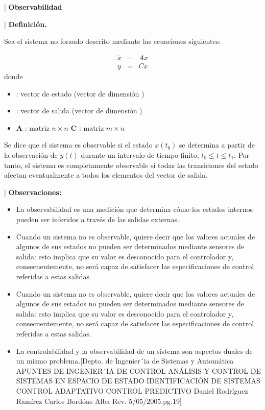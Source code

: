 \documentclass[10pt,a4paper]{article}
\begin{document}
\begin{center}|
{\Large \textbf{ Observabilidad}}\\
\end{center}

\begin{center}|
{\Large \textbf{ Definici\' on.}}\\
\end{center}
Sea el sistema no forzado descrito mediante las ecuaciones siguientes:

\begin{eqnarray}\label{sistem2}
\dot{x} & = & Ax \nonumber\\
y  & = & Cx 
\end{eqnarray}
donde
\begin{itemize}
\item {} : vector de estado (vector de dimensión )
\item {} : vector de salida (vector de dimensión )
\item \textbf{A} : matriz $n\times n$
\textbf{C} : matriz $m\times n$
\end{itemize}
Se dice que el sistema es observable si el estado $x(t_{0})$ se determina a partir de la observación de $y(t)$ durante un intervalo de tiempo finito, $t_{0}\leq t \leq t_{1}$. Por tanto, el sistema es completamente observable si todas las transiciones del estado afectan eventualmente a todos los elementos del vector de salida.\\
\begin{center}|
{\Large \textbf{ Observaciones:}}\\
\end{center}
\begin{itemize}
\item La observabilidad es una medición que determina c\' omo los estados internos pueden ser inferidos a trav\' es de las salidas externas.
\item Cuando un sistema no es observable, quiere decir que los valores actuales de algunos de sus estados no pueden ser determinados mediante sensores de salida: esto implica que su valor es desconocido para el controlador y, consecuentemente, no será capaz de satisfacer las especificaciones de control referidas a estas salidas.
\item Cuando un sistema no es observable, quiere decir que los valores actuales de algunos de sus estados no pueden ser determinados mediante sensores de salida: esto implica que su valor es desconocido para el controlador y, consecuentemente, no será capaz de satisfacer las especificaciones de control referidas a estas salidas.
\item La controlabilidad y la observabilidad de un sistema son aspectos duales de un mismo problema.[Depto. de Ingenier´ia de Sistemas y Autom\' atica
APUNTES DE INGENIER´IA DE CONTROL
AN\' ALISIS Y CONTROL DE SISTEMAS EN ESPACIO DE ESTADO
IDENTIFICACI\' ON DE SISTEMAS
CONTROL ADAPTATIVO
CONTROL PREDICTIVO
Daniel Rodr\' iguez Ram\' irez
Carlos Bord\' ons Alba
Rev. 5/05/2005.pg.19]
\end{itemize}
\end{document}
